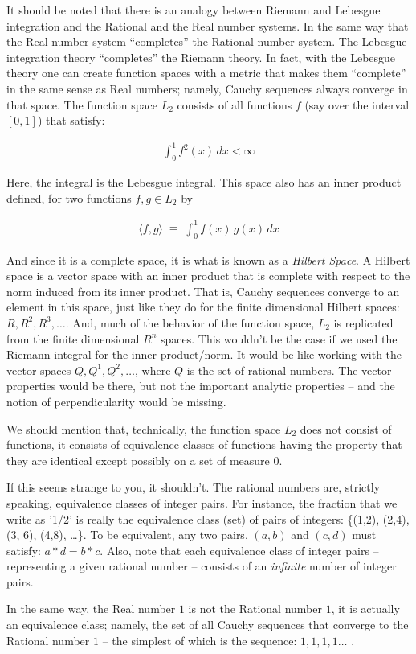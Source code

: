 \documentclass{article}
\begin{document}
It should be noted that there is an analogy between Riemann and Lebesgue integration 
and the Rational and the Real number systems. In the same way that the Real number 
system ``completes'' the Rational number system. The Lebesgue integration 
theory ``completes'' the Riemann theory. In fact, with the Lebesgue theory 
one can create function spaces with a metric that makes them ``complete'' 
in the same sense as Real numbers; namely, Cauchy sequences always converge 
in that space. The function space $L_2$ consists of all functions $f$ 
(say over the interval $[0,1]$) that satisfy:

\begin{eqnarray}
\int_0^1 f^2(x) \, dx < \infty
\end{eqnarray}

Here, the integral is the Lebesgue integral. This space also has an inner 
product defined, for two functions $f, g \in L_2$ by

\begin{eqnarray}
\langle f, g \rangle \; \equiv \; \int_0^1 f(x)\, g(x)\, dx
\end{eqnarray}

And since it is a complete space, it is what is known as a {\em Hilbert Space\/}.
A Hilbert space is a vector space with an inner product that is complete with 
respect to the norm induced from its inner product. 
That is, Cauchy sequences converge to an element in this
space, just like they do for the finite dimensional Hilbert spaces: $R, R^2, R^3, \ldots$.
And, much of the behavior of the function space, $L_2$ is replicated from 
the finite dimensional $R^n$ spaces. This wouldn't be the case if we used
the Riemann integral for the inner product/norm. It would be like
working with the vector spaces $Q, Q^1, Q^2, \ldots$, where $Q$ is the set 
of rational numbers. The vector properties would be there, but not 
the important analytic properties -- and the notion of perpendicularity would
be missing.

We should mention that, technically, the function space $L_2$ does not 
consist of functions, it consists of 
equivalence classes of functions having the property
that they are identical except possibly on a set of measure $0$.

If this seems strange to you, it shouldn't. The rational numbers are, strictly 
speaking, equivalence classes of integer pairs.
For instance, the fraction that we write as '1/2' is really the 
equivalence class (set) of pairs of integers: 
\{(1,2), (2,4), (3, 6), (4,8), \ldots \}.
To be equivalent, any two pairs, $(a, b)$ and $(c, d)$ must satisfy: 
$a * d = b * c$. Also, note that each equivalence class of integer pairs --
representing a given rational number -- consists of an {\em infinite\/} number 
of integer pairs.

In the same way, the Real number $1$ is not the Rational number $1$, it is 
actually an equivalence class; namely, the set of all Cauchy sequences that 
converge to the Rational number $1$ -- the simplest of which is the 
sequence: $1, 1, 1, 1\ldots$ .
\end{document}
